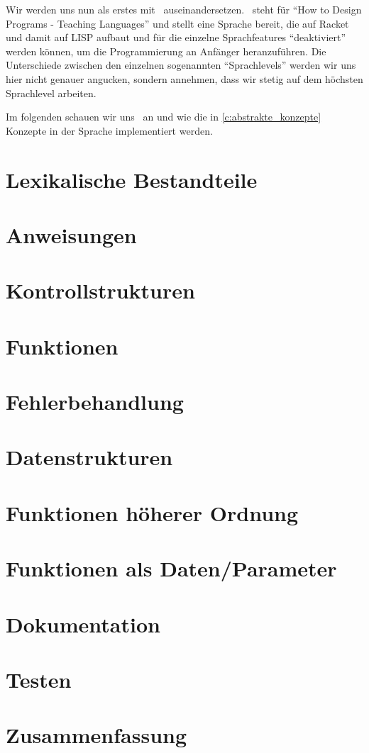 Wir werden uns nun als erstes mit \racket\, auseinandersetzen. \racket\, steht für \enquote{How to Design Programs - Teaching Languages} und stellt eine Sprache bereit, die auf Racket und damit auf LISP aufbaut und für die einzelne Sprachfeatures \enquote{deaktiviert} werden können, um die Programmierung an Anfänger heranzuführen. Die Unterschiede zwischen den einzelnen sogenannten \enquote{Sprachlevels} werden wir uns hier nicht genauer angucken, sondern annehmen, dass wir stetig auf dem höchsten Sprachlevel arbeiten.

Im folgenden schauen wir uns \racket\, an und wie die in \ref{c:abstrakte_konzepte} Konzepte in der Sprache implementiert werden.

\section{Lexikalische Bestandteile}
	

\section{Anweisungen}
	

\section{Kontrollstrukturen}
	

\section{Funktionen}
	

\section{Fehlerbehandlung}
	

\section{Datenstrukturen}
	

\section{Funktionen höherer Ordnung}
	

\section{Funktionen als Daten/Parameter}
	

\section{Dokumentation}
	

\section{Testen}
	

\section{Zusammenfassung}
	
